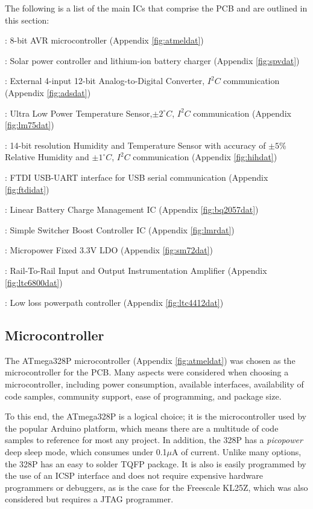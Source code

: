 \documentclass{article}
\numberwithin{figure}{section}
\numberwithin{equation}{section}
\begin{document}
{\bigskip
The following is a list of the main ICs that comprise the PCB and are outlined in this section:
\begin{description}[font=$\bullet$\scshape\bfseries]
\item[Atmel ATMega328P]: 8-bit AVR microcontroller (Appendix \ref{fig:atmeldat})
\item[SPV1040 Max Point Power Tracker]: Solar power controller and lithium-ion battery charger (Appendix \ref{fig:spvdat})
\item[ADS1015]: External 4-input 12-bit Analog-to-Digital Converter, $I^2 C$ communication (Appendix \ref{fig:adsdat})
\item[LM75BD]: Ultra Low Power Temperature Sensor,$\pm 2^{\circ}C$, $I^2 C$ communication (Appendix \ref{fig:lm75dat})
\item[(Optional) HIH6130]: 14-bit resolution Humidity and Temperature Sensor with accuracy of $\pm5$\% Relative Humidity and $\pm 1^{\circ}C$, $I^2 C$ communication (Appendix \ref{fig:hihdat})
\item[FT230X]: FTDI USB-UART interface for USB serial communication (Appendix \ref{fig:ftdidat})
\item[BQ2057CTS]: Linear Battery Charge Management IC (Appendix \ref{fig:bq2057dat})
\item[LM61428]: Simple Switcher Boost Controller IC (Appendix \ref{fig:lmrdat})
\item[SM72238]: Micropower Fixed 3.3V LDO (Appendix \ref{fig:sm72dat})
\item[LTC6800]: Rail-To-Rail Input and Output Instrumentation Amplifier (Appendix \ref{fig:ltc6800dat})
\item[LTC4412]: Low loss powerpath controller (Appendix \ref{fig:ltc4412dat})
\end{description}

\subsection{Microcontroller} \label{sect:micro_just}
The ATmega328P microcontroller (Appendix \ref{fig:atmeldat}) was chosen as the microcontroller for the PCB. Many aspects were considered when choosing a microcontroller, including power consumption, available interfaces, availability of code samples, community support, ease of programming, and package size.

\bigskip
To this end, the ATmega328P is a logical choice; it is the microcontroller used by the popular Arduino platform, which means there are a multitude of code samples to reference for most any project. In addition, the 328P has a \textit{picopower} deep sleep mode, which consumes under 0.1$\mu$A of current. Unlike many options, the 328P has an easy to solder TQFP package. It is also is easily programmed by the use of an ICSP interface and does not require expensive hardware programmers or debuggers, as is the case for the Freescale KL25Z, which was also considered but requires a JTAG programmer.

}
\end{document}
